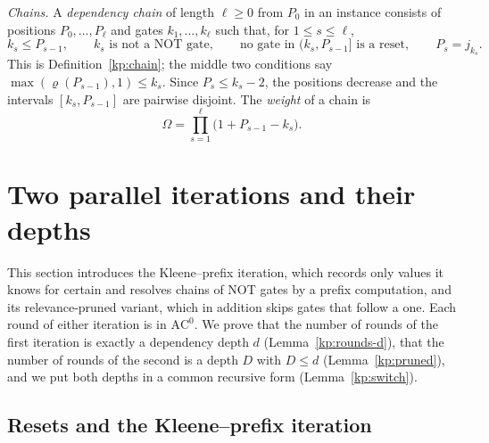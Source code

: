 \documentclass[11pt]{amsart}
\theoremstyle{definition}
\theoremstyle{remark}
\newcommand{\eps}{\varepsilon}
\newcommand{\jt}{\tilde{\jmath}}
\newcommand{\NOR}{\mathrm{NOR}}
\newcommand{\val}{\mathrm{val}}
\newcommand{\PP}{\mathbb{P}}
\newcommand{\EE}{\mathbb{E}}
\newcommand{\cF}{\mathcal{F}}
\begin{document}
\emph{Chains.} A \emph{dependency chain} of length $\ell\ge 0$ from $P_0$ in an instance consists
of positions $P_0,\dots,P_\ell$ and gates $k_1,\dots,k_\ell$ such that, for $1\le s\le \ell$,
\[
k_s\le P_{s-1},\qquad k_s\text{ is not a NOT gate},\qquad\text{no gate in }(k_s,P_{s-1}]\text{ is a reset},\qquad P_s=j_{k_s}.
\]
This is Definition~\ref{kp:chain}; the middle two conditions say
$\max(\varrho(P_{s-1}),1)\le k_s$. Since $P_s\le k_s-2$, the positions decrease and the intervals
$[k_s,P_{s-1}]$ are pairwise disjoint. The \emph{weight} of a chain is
\[
\Omega=\prod_{s=1}^{\ell}\bigl(1+P_{s-1}-k_s\bigr).
\]

\providecommand{\ind}{\mathbf{1}}
\providecommand{\epsK}{\eps_{\mathrm K}}
\providecommand{\epsB}{\eps_{\mathrm B}}
\providecommand{\gmin}{g_{\min}}
\providecommand{\AC}{\mathrm{AC}}
\providecommand{\NC}{\mathrm{NC}}
\providecommand{\BPNC}{\mathrm{BPNC}}

\section{Two parallel iterations and their depths}\label{sec:iterations}

This section introduces the Kleene--prefix iteration, which records only values
it knows for certain and resolves chains of NOT gates by a prefix computation,
and its relevance-pruned variant, which in addition skips gates that follow a
one. Each round of either iteration is in $\AC^0$. We prove that the number of
rounds of the first iteration is exactly a dependency depth $d$
(Lemma~\ref{kp:rounds-d}), that the number of rounds of the second is a depth
$D$ with $D\le d$ (Lemma~\ref{kp:pruned}), and we put both depths in a common
recursive form (Lemma~\ref{kp:switch}).

\subsection{Resets and the Kleene--prefix iteration}\label{kp:sub-resets}
\end{document}
